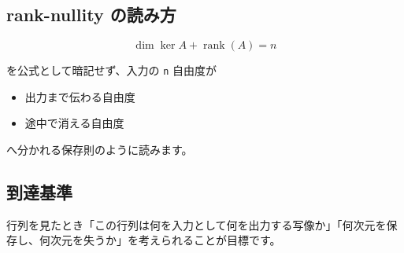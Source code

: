 \documentclass[
  11pt,
  a4paper,
]{ltjsarticle}
\providecommand{\tightlist}{%
  \setlength{\itemsep}{0pt}\setlength{\parskip}{0pt}}
\begin{document}
\hypertarget{rank-nullity-ux306eux8aadux307fux65b9}{%
\subsection{rank-nullity
の読み方}\label{rank-nullity-ux306eux8aadux307fux65b9}}

\[
\dim\ker A+\operatorname{rank}(A)=n
\]

を公式として暗記せず、入力の \texttt{n} 自由度が

\begin{itemize}
\tightlist
\item
  出力まで伝わる自由度
\item
  途中で消える自由度
\end{itemize}

へ分かれる保存則のように読みます。

\hypertarget{ux5230ux9054ux57faux6e96}{%
\subsection{到達基準}\label{ux5230ux9054ux57faux6e96}}

行列を見たとき「この行列は何を入力として何を出力する写像か」「何次元を保存し、何次元を失うか」を考えられることが目標です。
\end{document}
